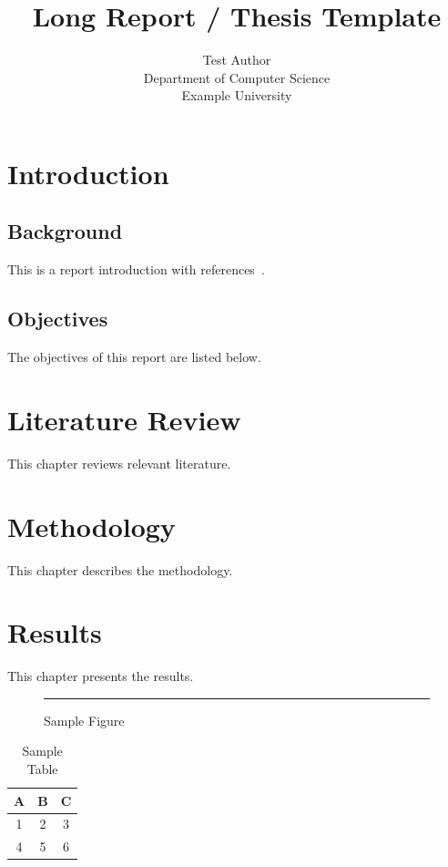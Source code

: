 \documentclass{report}
\title{Long Report / Thesis Template}
\author{Test Author\\
        Department of Computer Science\\
        Example University}
\begin{document}
\maketitle

\tableofcontents
\listoffigures
\listoftables

\chapter{Introduction}
\label{chap:intro}

\section{Background}

This is a report introduction with references~\cite{ref1}.

\section{Objectives}

The objectives of this report are listed below.

\chapter{Literature Review}
\label{chap:lit}

This chapter reviews relevant literature.

\chapter{Methodology}
\label{chap:method}

This chapter describes the methodology.

\chapter{Results}
\label{chap:results}

This chapter presents the results.

\begin{figure}[ht]
  \centering
  \rule{6cm}{4cm}
  \caption{Sample Figure}
  \label{fig:sample}
\end{figure}

\begin{table}[ht]
  \centering
  \caption{Sample Table}
  \label{tab:sample}
  \begin{tabular}{ccc}
    \toprule
    A & B & C \\
    \midrule
    1 & 2 & 3 \\
    4 & 5 & 6 \\
    \bottomrule
  \end{tabular}
\end{table}
\end{document}
